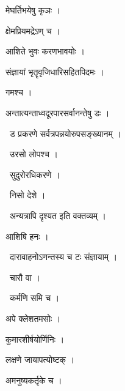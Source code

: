 \documentclass[10pt, openany, oneside]{book}
\begin{document}
\noindent मेघर्तिभयेषु कृञः ।

\noindent क्षेमप्रियमद्रेऽण् च ।

\noindent आशिते भुवः करणभावयोः ।

\noindent संज्ञायां भृतॄवृजिधारिसहितपिदमः ।

\noindent गमश्च ।

\noindent अन्तात्यन्ताध्वदूरपारसर्वानन्तेषु डः ।

\par\noindent\hspace{1.5em}{\vps वा॰}~{\qt ड प्रकरणे सर्वत्रपन्नयोरुपसङ्ख्यानम् ।}

\par\noindent\hspace{1.5em}{\vps वा॰}~{\qt उरसो लोपश्च ।}

\par\noindent\hspace{1.5em}{\vps वा॰}~{\qt सुदुरोरधिकरणे ।}

\par\noindent\hspace{1.5em}{\vps वा॰}~{\qt निसो देशे ।}

\par\noindent\hspace{1.5em}{\vps वा॰}~{\qt अन्यत्रापि दृश्यत इति वक्तव्यम् ।}

\noindent आशिषि हनः ।

\par\noindent\hspace{1.5em}{\vps वा॰}~{\qt दारावाहनोऽणन्तस्य च टः संज्ञायाम् ।}

\par\noindent\hspace{1.5em}{\vps वा॰}~{\qt चारौ वा ।}

\par\noindent\hspace{1.5em}{\vps वा॰}~{\qt कर्मणि समि च ।}

\noindent अपे क्लेशतमसोः ।

\noindent कुमारशीर्षयोर्णिनिः ।

\noindent लक्षणे जायापत्योष्टक् ।

\noindent अमनुष्यकर्तृके च ।
\end{document}
